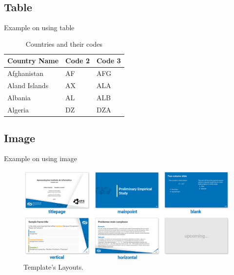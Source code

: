 \documentclass[aspectratio=169,t,xcolor=table]{beamer}
\begin{document}
\subsection{Table}

\begin{frame}{Example on using table}

    \begin{table}[]
        \centering
        \caption{\label{tab:1}Countries and their codes}
        
        \renewcommand{\arraystretch}{1.5}
        \setlength{\tabcolsep}{10pt}
        
        {
            \begin{tabular}{ p{3cm}p{3cm}p{3cm}  }
                \toprule 
                \textbf{Country Name} & \textbf{Code 2} & \textbf{Code 3} \\
                \midrule
                Afghanistan & AF &AFG \\
                Aland Islands & AX   & ALA \\
                Albania &AL & ALB \\
                Algeria    &DZ & DZA \\
                \bottomrule
            \end{tabular}
        }
    \end{table}
    
\end{frame}

\subsection{Image}

\begin{frame}{Example on using image}

    \begin{figure}
        \centering
        \includegraphics[width=.9\textwidth]{readme/layouts.png}
        \caption{Template's Layouts.}
        \label{fig:layouts}
    \end{figure}
    
\end{frame}
\end{document}
